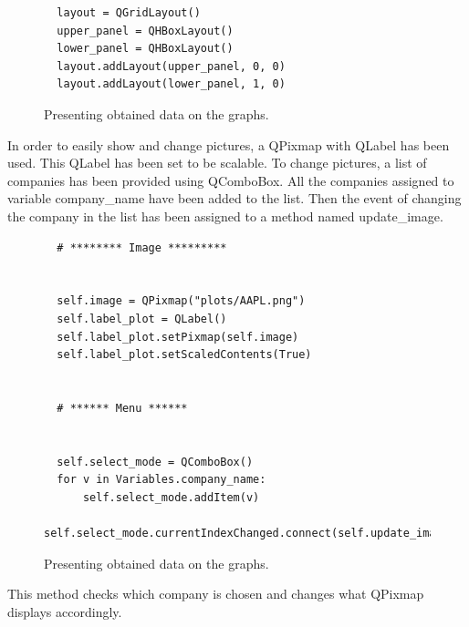 \begin{figure}
\centering
\begin{lstlisting}
  layout = QGridLayout()
  upper_panel = QHBoxLayout()
  lower_panel = QHBoxLayout()
  layout.addLayout(upper_panel, 0, 0)
  layout.addLayout(lower_panel, 1, 0)
\end{lstlisting}
\caption{Presenting obtained data on the graphs.}
\label{fig:pseudocode:listings}
\end{figure}

\clearpage
In order to easily show and change pictures, a QPixmap with QLabel has been used.
This QLabel has been set to be scalable. To change pictures, a list of companies has been provided using QComboBox. All the companies assigned to variable company{\_}name have been added to the list. Then the event of changing the company in the list has been assigned to a method named update{\_}image.

\begin{figure}
\centering
\begin{lstlisting}
  # ******** Image *********


  self.image = QPixmap("plots/AAPL.png")
  self.label_plot = QLabel()
  self.label_plot.setPixmap(self.image)
  self.label_plot.setScaledContents(True)


  # ****** Menu ******


  self.select_mode = QComboBox()
  for v in Variables.company_name:
      self.select_mode.addItem(v)
  self.select_mode.currentIndexChanged.connect(self.update_image)

\end{lstlisting}
\caption{Presenting obtained data on the graphs.}
\label{fig:pseudocode:listings}
\end{figure}

\clearpage
This method checks which company is chosen and changes what QPixmap displays accordingly.

